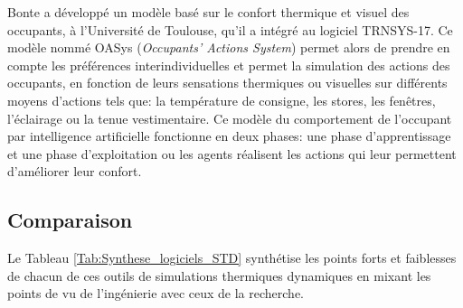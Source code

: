 Bonte \cite{Bonte-14} a développé un modèle basé sur le confort thermique et visuel des occupants, à l'Université de Toulouse, qu'il a intégré au logiciel TRNSYS-17. Ce modèle nommé OASys (\textit{Occupants’ Actions System}) permet alors de prendre en compte les préférences interindividuelles et permet la simulation des actions des occupants, en fonction de leurs sensations thermiques ou visuelles sur différents moyens d'actions tels que: la température de consigne, les stores, les fenêtres, l'éclairage ou la tenue vestimentaire. Ce modèle du comportement de l'occupant par intelligence artificielle fonctionne en deux phases: une phase d'apprentissage et une phase d'exploitation ou les agents réalisent les actions qui leur permettent d'améliorer leur confort.

\subsection*{Comparaison}

Le Tableau \ref{Tab:Synthese_logiciels_STD} synthétise les points forts et faiblesses de chacun de ces outils de simulations thermiques dynamiques en mixant les points de vu de l'ingénierie avec ceux de la recherche.

